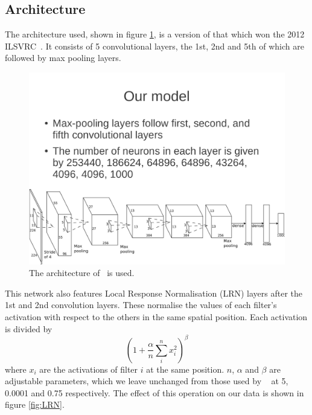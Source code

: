 \documentclass[11pt]{article} %
\begin{document}
\subsection{Architecture}



\label{sec:alexNet}

The architecture used, shown in figure \ref{fig:alexNet}, is a version of that which won the 2012 ILSVRC~\cite{Krizhevsky2012}. It consists of 5 convolutional layers, the 1st, 2nd and 5th of which are followed by max pooling layers. 

\begin{figure}
\centering
\includegraphics*[width=\linewidth,trim={0cm 0cm 0.79cm 12cm},clip]{alexNet} 
\caption{ The architecture of~\cite{Krizhevsky2012} is used.\label{fig:alexNet}}
\end{figure}



This network also features Local Response Normalisation (LRN) layers after the 1st and 2nd convolution layers. These normalise the values of each filter's activation with respect to the others in the same spatial position. Each activation is divided by
\begin{equation}
(1 + \frac{\alpha}{n} \sum_i^n x_i^2)^\beta
\end{equation}
where $x_i$ are the activations of filter $i$ at the same position. $n$, $\alpha$ and $\beta$ are adjustable parameters, which we leave unchanged from those used by ~\cite{Krizhevsky2012} at 5, 0.0001 and 0.75 respectively. The effect of this operation on our data is shown in figure \ref{fig:LRN}. 
\end{document}
